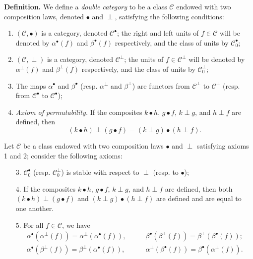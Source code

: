 \documentclass{article}
\newenvironment{rmenv}[1]
  {\phantomsection\par\medskip\noindent\textbf{#1.}\rmfamily}
  {\par\medskip}
\newcommand{\CC}{\mathcal{C}}
\begin{document}
\begin{rmenv}{Definition}
  We define a \emph{double category} to be a class $\CC$ endowed with two composition laws, denoted $\bullet$ and $\perp$, satisfying the following conditions:

  \begin{enumerate}
    \item $(\CC,\bullet)$ is a category, denoted $\CC^\bullet$;
      the right and left units of $f\in\CC$ will be denoted by $\alpha^\bullet(f)$ and $\beta^\bullet(f)$ respectively, and the class of units by $\CC_0^\bullet$;
    \item $(\CC,\perp)$ is a category, denoted $\CC^\perp$;
      the units of $f\in\CC^\perp$ will be denoted by $\alpha^\perp(f)$ and $\beta^\perp(f)$ respectively, and the class of units by $\CC_0^\perp$;
    \item The maps $\alpha^\bullet$ and $\beta^\bullet$ (resp. $\alpha^\perp$ and $\beta^\perp$) are functors from $\CC^\perp$ to $\CC^\perp$ (resp. from $\CC^\bullet$ to $\CC^\bullet$);
    \item \emph{Axiom of permutability.}
      If the composites $k\bullet h$, $g\bullet f$, $k\perp g$, and $h\perp f$ are defined, then
      \[
        (k\bullet h)\perp(g\bullet f)
        = (k\perp g)\bullet(h\perp f).
      \]
  \end{enumerate}

  Let $\CC$ be a class endowed with two composition laws $\bullet$ and $\perp$ satisfying axioms 1 and 2; consider the following axioms:

  \begin{enumerate}
    \item[3\textquotesingle.]
      $\CC_0^\bullet$ (resp. $\CC_0^\perp$) is stable with respect to $\perp$ (resp. to $\bullet$);
    \item[4\textquotesingle.]
      If the composites $k\bullet h$, $g\bullet f$, $k\perp g$, and $h\perp f$ are defined, then both $(k\bullet h)\perp(g\bullet f)$ and $(k\perp g)\bullet(h\perp f)$ are defined and are equal to one another.
    \item[5.]
      For all $f\in\CC$, we have
      \[
        \begin{aligned}
          \alpha^\bullet(\alpha^\perp(f))
          = \alpha^\perp(\alpha^\bullet(f)),
          &\qquad
          \beta^\bullet(\beta^\perp(f))
          = \beta^\perp(\beta^\bullet(f));
        \\\alpha^\bullet(\beta^\perp(f))
          = \beta^\perp(\alpha^\bullet(f)),
          &\qquad
          \alpha^\perp(\beta^\bullet(f))
          = \beta^\bullet(\alpha^\perp(f)).
        \end{aligned}
      \]
  \end{enumerate}
\end{rmenv}
\end{document}

